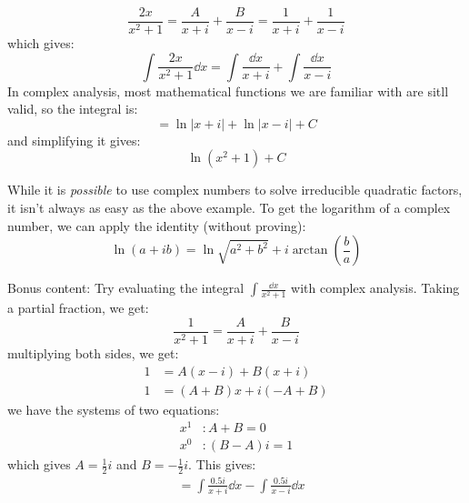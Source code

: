 \begin{itemize}
\begin{example}
\begin{equation}
            \frac{2x}{x^2+1} = \frac{A}{x+i} + \frac{B}{x-i} = \frac{1}{x+i} + \frac{1}{x-i}
        \end{equation}
        which gives:
        \begin{equation}
            \int \frac{2x}{x^2+1} \dd{x} = \int \frac{\dd{x}}{x+i} + \int \frac{\dd{x}}{x-i}
        \end{equation}
        In complex analysis, most mathematical functions we are familiar with are sitll valid, so the integral is:
        \begin{equation}
            = \ln|x+i| + \ln|x-i| + C
        \end{equation}
        and simplifying it gives:
        \begin{equation}
            \ln(x^2+1) + C
        \end{equation}
    \end{example}
    \begin{warning}
        While it is \textit{possible} to use complex numbers to solve irreducible quadratic factors, it isn't always as easy as the above example. To get the logarithm of a complex number, we can apply the identity (without proving):
        \begin{equation}
            \ln(a+ib) = \ln\sqrt{a^2+b^2} + i \arctan\left(\frac{b}{a}\right)
        \end{equation}
    \end{warning}
    \begin{example}
        Bonus content: Try evaluating the integral $\int \frac{\dd{x}}{x^2+1}$ with complex analysis. Taking a partial fraction, we get:
        \begin{equation}
            \frac{1}{x^2+1} = \frac{A}{x+i} + \frac{B}{x-i}
        \end{equation}
        multiplying both sides, we get:
        \begin{align}
            1 &= A(x-i) + B(x+i) \\ 
            1 &= (A+B)x + i(-A+B)
        \end{align}
        we have the systems of two equations:
        \begin{align}
            x^1 &: A+B = 0 \\ 
            x^0 &: (B-A)i = 1
        \end{align}
        which gives $A=\frac{1}{2}i$ and $B=-\frac{1}{2}i$. This gives:
        \begin{align}
            &= \int \frac{0.5i}{x+i} \dd{x} - \int \frac{0.5i}{x-i} \dd{x} \\ 

\end{align}
\end{example}
\end{itemize}
